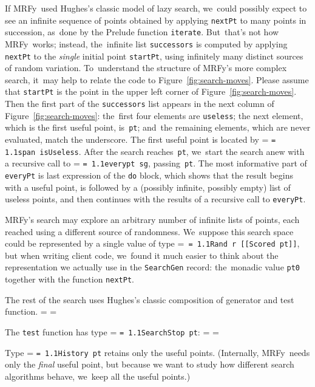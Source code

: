 \documentclass[]{jfp1}
\makeatletter
\newcommand\mrfy{MRFy} %
\newcommand\figref[1]{Figure~\ref{fig:#1}}
\newif\ifverbatimsmall
\newcommand{\mono}[1]{%
  {\@tempdima = \fontdimen2\font
   \texttt{\spaceskip = 1.1\@tempdima #1}}}
\newcommand\smallverbatiminput[1]{%
  \verbatimsmalltrue
  \presvtopsep=\topsep
  \topsep=0.78\topsep
  \verbatimsmallfalse
  \topsep=\presvtopsep
}
\makeatother
\begin{document}
If \mrfy\ used Hughes's classic model of lazy search,
we~could possibly expect to see an infinite sequence of points obtained by
applying \texttt{nextPt} to many points in succession, as~done by
the Prelude function \texttt{iterate}.
But~that's not how \mrfy\ works;
instead, 
the~infinite list \texttt{successors}
is computed by applying \texttt{nextPt} to
the \emph{single} initial point \texttt{startPt}, \mbox{using} infinitely
many distinct sources of random variation.
To~understand the structure of
 \mrfy's more complex search, it~may help to
relate the code to \figref{search-moves}.
Please assume that \texttt{startPt} is the point in the upper left
corner of \figref{search-moves}.
Then the first part of the \texttt{successors} list appears in the
next column of \figref{search-moves}:
the~first four elements are \texttt{useless};
the next element, which is the first useful point, is~\texttt{pt};
and~the remaining elements, which are never evaluated,
match the
underscore.
The first useful point is located by \mono{span~isUseless}.
After the search reaches~\texttt{pt},
we~start the search anew with a recursive 
call to \mono{everypt~sg}, 
passing~\texttt{pt}.
%
The most informative part of \texttt{everyPt} is last expression of
the \texttt{do} block,
which shows that the result begins with a useful point,
is followed by a (possibly infinite, possibly empty) list of useless
points, and then continues with the results of a recursive call
to \texttt{everyPt}. 





\mrfy's search may explore an arbitrary number of infinite
lists of points, each reached using a different source of randomness.
We~suppose this search space could be represented by a single
value of type \mbox{\mono{Rand r [[Scored pt]]}}, but when writing
client code, we~found it much easier to think about the
representation we actually use in the
\texttt{SearchGen} record:
the~monadic value
\texttt{pt0} together with the function \texttt{nextPt}.





The rest of the search uses Hughes's
classic composition of generator  and test function.
\smallverbatiminput{search}
The \texttt{test} function has type \mono{SearchStop~pt}:
\smallverbatiminput{stop}
Type \mono{History~pt} retains only the useful points.
(Internally, \mrfy\ needs only the \emph{final} useful point,
but because we want to study how different search algorithms behave,
we~keep all the useful points.)
\end{document}
